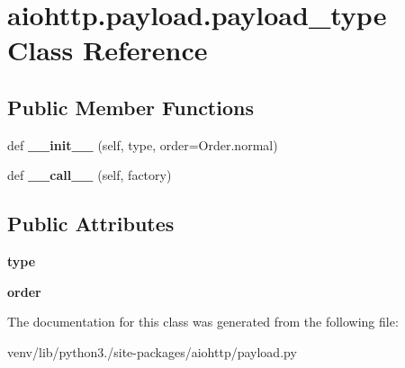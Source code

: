 \hypertarget{classaiohttp_1_1payload_1_1payload__type}{}\section{aiohttp.\+payload.\+payload\+\_\+type Class Reference}
\label{classaiohttp_1_1payload_1_1payload__type}
\subsection*{Public Member Functions}
\begin{DoxyCompactItemize}
\item 
\mbox{\label{classaiohttp_1_1payload_1_1payload__type_a81558f1bed971f2cc11508984b123ab1}} 
def {\bfseries \+\_\+\+\_\+init\+\_\+\+\_\+} (self, type, order=Order.\+normal)
\item 
\mbox{\label{classaiohttp_1_1payload_1_1payload__type_ad4b75bbf79e22520e286e7dd97efe0ab}} 
def {\bfseries \+\_\+\+\_\+call\+\_\+\+\_\+} (self, factory)
\end{DoxyCompactItemize}
\subsection*{Public Attributes}
\begin{DoxyCompactItemize}
\item 
\mbox{\label{classaiohttp_1_1payload_1_1payload__type_a00539b80404d976ad5b4fb7ce943450b}} 
{\bfseries type}
\item 
\mbox{\label{classaiohttp_1_1payload_1_1payload__type_af4fddaace507a75673c09c0717b69b07}} 
{\bfseries order}
\end{DoxyCompactItemize}


The documentation for this class was generated from the following file\+:\begin{DoxyCompactItemize}
\item 
venv/lib/python3./site-\/packages/aiohttp/payload.\+py\end{DoxyCompactItemize}
